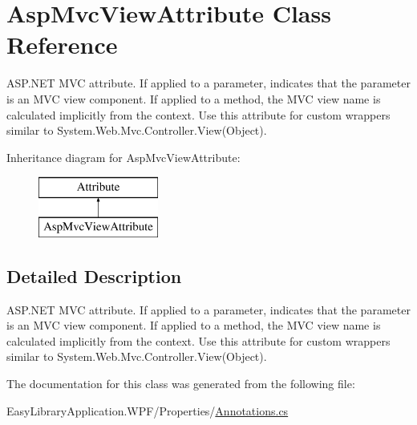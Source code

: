 \hypertarget{class_asp_mvc_view_attribute}{}\section{Asp\+Mvc\+View\+Attribute Class Reference}
\label{class_asp_mvc_view_attribute}


A\+S\+P.\+N\+ET M\+VC attribute. If applied to a parameter, indicates that the parameter is an M\+VC view component. If applied to a method, the M\+VC view name is calculated implicitly from the context. Use this attribute for custom wrappers similar to {\ttfamily System.\+Web.\+Mvc.\+Controller.\+View(\+Object)}.  


Inheritance diagram for Asp\+Mvc\+View\+Attribute\+:\begin{figure}[H]
\begin{center}
\leavevmode
\includegraphics[height=2.000000cm]{class_asp_mvc_view_attribute}
\end{center}
\end{figure}


\subsection{Detailed Description}
A\+S\+P.\+N\+ET M\+VC attribute. If applied to a parameter, indicates that the parameter is an M\+VC view component. If applied to a method, the M\+VC view name is calculated implicitly from the context. Use this attribute for custom wrappers similar to {\ttfamily System.\+Web.\+Mvc.\+Controller.\+View(\+Object)}. 



The documentation for this class was generated from the following file\+:\begin{DoxyCompactItemize}
\item 
Easy\+Library\+Application.\+W\+P\+F/\+Properties/\mbox{\hyperlink{_annotations_8cs}{Annotations.\+cs}}\end{DoxyCompactItemize}
